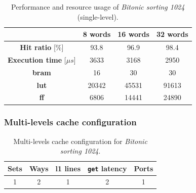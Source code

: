 \documentclass[11pt,a4paper,oneside]{memoir}
\begin{document}
\begin{table}[H]
	\begin{center}
		\begin{tabular}{cccc}
			\hline
			\rowcolor{gray!50}
			& \textbf{8 words} & \textbf{16 words} & \textbf{32 words} \\
			\hline
			\textbf{Hit ratio} [\%] & 93.8 & 96.9 & 98.4 \\
			\rowcolor{gray!25}
			\textbf{Execution time} [$\mu s$] & 3633 & 3168 & 2950 \\
			\textbf{\ac{bram}} & 16 & 30 & 30 \\
			\rowcolor{gray!25}
			\textbf{\acs{lut}} & 20342 & 45531 & 91613 \\
			\textbf{\acs{ff}} & 6806 & 14441 & 24890 \\
			\hline
		\end{tabular}
	\end{center}
	\caption{Performance and resource usage of \emph{Bitonic sorting 1024}
	(single-level).}
	\label{tab:bitonic_1024_no_l1_report}
\end{table}

\subsubsection{Multi-levels cache configuration}
\begin{table}[!htb]
	\begin{center}
		\begin{tabular}{ccccc}
			\hline
			\rowcolor{gray!50}
			\textbf{Sets} & \textbf{Ways} & \textbf{\ac{l1} lines} &
			\textbf{\texttt{get} latency} & \textbf{Ports} \\
			\hline
			1 & 2 & 1 & 2 & 1 \\
			\hline
		\end{tabular}
	\end{center}
	\caption{Multi-levels cache configuration for \emph{Bitonic sorting 1024}.}
	\label{tab:bitonic_1024_l1_config}
\end{table}
\end{document}
